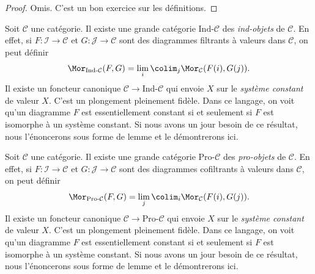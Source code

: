\begin{proof}
Omis. C'est un bon exercice sur les définitions.
\end{proof}

\begin{remark}
\label{remark-ind-category}
Soit $\mathcal{C}$ une catégorie. Il existe une grande catégorie
$\text{Ind-}\mathcal{C}$ des {\it ind-objets} de $\mathcal{C}$. En effet, si
$F : \mathcal{I} \to \mathcal{C}$ et $G : \mathcal{J} \to \mathcal{C}$
sont des diagrammes filtrants à valeurs dans $\mathcal{C}$, on peut définir
$$
\Mor_{\text{Ind-}\mathcal{C}}(F, G) =
\lim_i \colim_j \Mor_\mathcal{C}(F(i), G(j)).
$$
Il existe un foncteur canonique $\mathcal{C} \to \text{Ind-}\mathcal{C}$ qui
envoie $X$ sur le {\it système constant} de valeur $X$. C'est un plongement
pleinement fidèle. Dans ce langage, on voit qu'un diagramme $F$ est
essentiellement constant si et seulement si $F$ est isomorphe à un système
constant. Si nous avons un jour besoin de ce résultat, nous l'énoncerons sous
forme de lemme et le démontrerons ici.
\end{remark}

\begin{remark}
\label{remark-pro-category}
Soit $\mathcal{C}$ une catégorie. Il existe une grande catégorie
$\text{Pro-}\mathcal{C}$ des {\it pro-objets} de $\mathcal{C}$. En effet, si
$F : \mathcal{I} \to \mathcal{C}$ et $G : \mathcal{J} \to \mathcal{C}$
sont des diagrammes cofiltrants à valeurs dans $\mathcal{C}$, on peut définir
$$
\Mor_{\text{Pro-}\mathcal{C}}(F, G) =
\lim_j \colim_i \Mor_\mathcal{C}(F(i), G(j)).
$$
Il existe un foncteur canonique $\mathcal{C} \to \text{Pro-}\mathcal{C}$ qui
envoie $X$ sur le {\it système constant} de valeur $X$. C'est un plongement
pleinement fidèle. Dans ce langage, on voit qu'un diagramme $F$ est
essentiellement constant si et seulement si $F$ est isomorphe à un système
constant. Si nous avons un jour besoin de ce résultat, nous l'énoncerons sous
forme de lemme et le démontrerons ici.
\end{remark}


